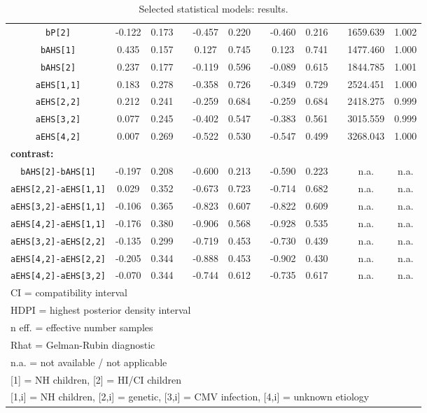 \begin{table}[h!]
\begin{tabular}{|cccccccccccc|}
		\texttt{bP[2]} & -0.122 & 0.173 & & -0.457 & 0.220 & & -0.460 & 0.216 & & 1659.639 & 1.002 \\
		\texttt{bAHS[1]} & 0.435 & 0.157 & & 0.127 & 0.745 & & 0.123 & 0.741 & & 1477.460 & 1.000 \\
		\texttt{bAHS[2]} & 0.237 & 0.177 & & -0.119 & 0.596 & & -0.089 & 0.615 & & 1844.785 & 1.001 \\
		\texttt{aEHS[1,1]} & 0.183 & 0.278 & & -0.358 & 0.726 & & -0.349 & 0.729 & & 2524.451 & 1.000 \\
		\texttt{aEHS[2,2]} & 0.212 & 0.241 & & -0.259 & 0.684 & & -0.259 & 0.684 & & 2418.275 & 0.999 \\
		\texttt{aEHS[3,2]} & 0.077 & 0.245 & & -0.402 & 0.547 & & -0.383 & 0.561 & & 3015.559 & 0.999 \\
		\texttt{aEHS[4,2]} & 0.007 & 0.269 & & -0.522 & 0.530 & & -0.547 & 0.499 & & 3268.043 & 1.000 \\
		\multicolumn{12}{|l|}{ \textbf{contrast:} } \\
		\texttt{bAHS[2]-bAHS[1]} & -0.197 & 0.208 & & -0.600 & 0.213 & & -0.590 & 0.223 & & n.a. & n.a. \\
		\texttt{aEHS[2,2]-aEHS[1,1]} & 0.029 & 0.352 & & -0.673 & 0.723 & & -0.714 & 0.682 & & n.a. & n.a. \\
		\texttt{aEHS[3,2]-aEHS[1,1]} & -0.106 & 0.365 & & -0.823 & 0.607 & & -0.822 & 0.609 & & n.a. & n.a. \\
		\texttt{aEHS[4,2]-aEHS[1,1]} & -0.176 & 0.380 & & -0.906 & 0.568 & & -0.928 & 0.535 & & n.a. & n.a. \\
		\texttt{aEHS[3,2]-aEHS[2,2]} & -0.135 & 0.299 & & -0.719 & 0.453 & & -0.730 & 0.439 & & n.a. & n.a. \\
		\texttt{aEHS[4,2]-aEHS[2,2]} & -0.205 & 0.344 & & -0.888 & 0.453 & & -0.902 & 0.430 & & n.a. & n.a. \\
		\texttt{aEHS[4,2]-aEHS[3,2]} & -0.070 & 0.344 & & -0.744 & 0.612 & & -0.735 & 0.617 & & n.a. & n.a. \\
		\hline
		\multicolumn{12}{l}{\footnotesize{CI = compatibility interval}} \\
		\multicolumn{12}{l}{\footnotesize{HDPI = highest posterior density interval}} \\
		\multicolumn{12}{l}{\footnotesize{n eff. = effective number samples}} \\
		\multicolumn{12}{l}{\footnotesize{Rhat = Gelman-Rubin diagnostic}} \\
		\multicolumn{12}{l}{\footnotesize{n.a. = not available / not applicable}} \\
		\multicolumn{12}{l}{\footnotesize{[1] = NH children, [2] = HI/CI children}} \\
		\multicolumn{12}{l}{\footnotesize{[1,i] = NH children, [2,i] = genetic, [3,i] = CMV infection, [4,i] = unknown etiology}} \\
	\end{tabular}
	\caption[Selected statistical models: results]{Selected statistical models: results.}
	\label{tab:results}
\end{table}

